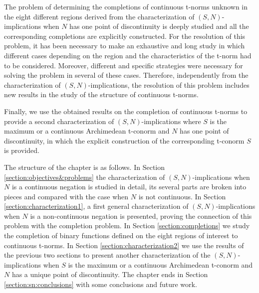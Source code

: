 The problem of determining the completions of continuous t-norms unknown in the eight different regions derived from the characterization of $(S,N)$-implications when $N$ has one point of discontinuity is deeply studied and all the corresponding completions are explicitly constructed. For the resolution of this problem, it has been necessary to make an exhaustive and long study in which different cases depending on the region and the characteristics of the t-norm had to be considered. Moreover, different and specific strategies were necessary for solving the problem in several of these cases. Therefore, independently from the characterization of $(S,N)$-implications, the resolution of this problem includes new results in the study of the structure of continuous t-norms.

Finally, we use the obtained results on the completion of continuous t-norms to provide a second characterization of $(S,N)$-implications where $S$ is the maximum or a continuous Archimedean t-conorm and $N$ has one point of discontinuity, in which the explicit construction of the corresponding t-conorm $S$ is provided.

The structure of the chapter is as follows. In Section \ref{section:objectives&problems} the characterization of $(S,N)$-implications when $N$ is a continuous negation is studied in detail, its several parts are broken into pieces and compared with the case when $N$ is not continuous. In Section \ref{section:characterization1}, a first general characterization of $(S,N)$-implications when $N$ is a non-continuous negation is presented, proving the connection of this problem with the completion problem. In Section \ref{section:completions} we study the completion of binary functions defined on the eight regions of interest to continuous t-norms. In Section \ref{section:characterization2} we use the results of the previous two sections to present another characterization of the $(S,N)$-implications when $S$ is the maximum or a continuous Archimedean t-conorm and $N$ has a unique point of discontinuity. The chapter ends in Section \ref{section:sn:conclusions} with some conclusions and future work.


